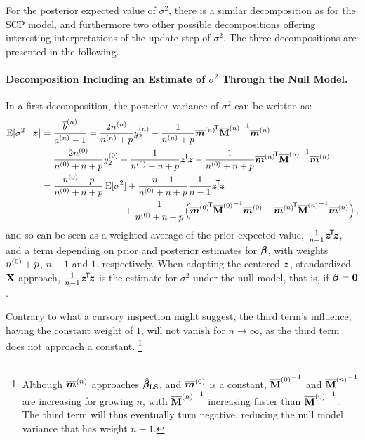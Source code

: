 For the posterior expected value of $\sigma^2$, there is a similar decomposition
as for the SCP model, and furthermore two other possible decompositions offering
interesting interpretations of the update step of $\sigma^2$.
The three decompositions are presented in the following.


\paragraph{Decomposition Including an Estimate of \texorpdfstring{$\sigma^2$}{sigma2} Through the Null Model.}

In a first decomposition, the posterior variance of $\sigma^2$ can be written as:
\begin{align}
\E[\sigma^2\mid \z] &= \frac{\tbn}{\tan - 1} %
                     = \frac{2 \nn}{\nn + p} \yn_2 - \frac{1}{\nn + p} {\tmn}^\tra {\tMn}^{-1} \tmn \nonumber\\
                    &= \frac{2 \nz}{\nz + n + p} \yz_2
                     + \frac{1}{\nz + n + p} \ztz
                     - \frac{1}{\nz + n + p} {\tmn}^\tra {\tMn}^{-1} \tmn \nonumber\\
                    &= \frac{\nz + p}{\nz + n + p} \E[\sigma^2]
                         + \frac{n-1}{\nz + n + p} \frac{1}{n-1} \ztz \nonumber\\ & \hspace*{20.6ex}
                         +   \frac{1}{\nz + n + p} \Big( {\tmz}^\tra {\tMz}^{-1} \tmz
                                                       - {\tmn}^\tra {\tMn}^{-1} \tmn \Big)\,,
\label{equ:cccp-sigma1}
%
\end{align}
and so can be seen as a weighted average of the prior expected value,
$\frac{1}{n-1}{\bm z}^{{\mbox{\!\scriptsize\textsf{T}}}} \! {\bm z}$, and a term depending on %
prior and posterior estimates for $\boldsymbol{\beta}$, with weights $n^{(0)} + p$, $n-1$ and $1$, respectively.
When adopting the centered ${\bm z}$, standardized $\mathbf{X}$ approach,
$\frac{1}{n-1}{\bm z}^{{\mbox{\!\scriptsize\textsf{T}}}} \! {\bm z}$ is the estimate for $\sigma^2$ under the null model, that is, if $\boldsymbol{\beta} = {\bm0}$.

Contrary to what a cursory inspection might suggest,
the third term's influence, having the constant weight of $1$,
will not vanish for $n \to \infty$, %
as the third term does not approach a constant.%
\footnote{Although $\overline{{\bm m}}^{(n)}$ approaches $\hat{\boldsymbol{\beta}}_\text{LS}$, and $\overline{{\bm m}}^{(0)}$ is a constant,
${\overline{\mathbf{M}}^{(0)}}^{-1}$ and ${\overline{\mathbf{M}}^{(n)}}^{-1}$ are increasing for growing $n$,
with ${\overline{\mathbf{M}}^{(n)}}^{-1}$ increasing faster than ${\overline{\mathbf{M}}^{(0)}}^{-1}$.
The third term will thus eventually turn negative, reducing the null model variance that has weight $n-1$.}

